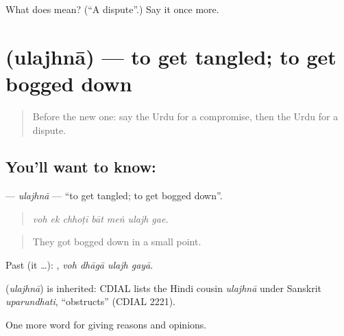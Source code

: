 \begin{tcolorbox}[breakable,colback=teal!4,colframe=teal!35!black,title={Before you move on}]
What does  mean? (\textquotedblleft{}A dispute\textquotedblright{}.) Say it once more.
\end{tcolorbox}
\section[\texorpdfstring{\ur{الجھنا} (ulajhnā)}{الجھنا (ulajhnā)}]{ (ulajhnā) — to get tangled; to get bogged down}

\label{lesson:UR-C347-ulajhna}



\begin{quote}
Before the new one: say the Urdu for a compromise, then the Urdu for a dispute.
\end{quote}

\subsection*{You'll want to know: }
\textbf{} — \emph{ulajhnā} — \textquotedblleft{}to get tangled; to get bogged down\textquotedblright{}.

\begin{quote}
      
\end{quote}

\begin{quote}
\emph{voh ek chhoṭī bāt meṅ ulajh gae.}
\end{quote}

\begin{quote}
They got bogged down in a small point.
\end{quote}

Past (it …):    , \emph{voh dhāgā ulajh gayā}.

\begin{cousinweb}
\textbf{} (\emph{ulajhnā}) is inherited: CDIAL lists the Hindi cousin \emph{ulajhnā} under Sanskrit \emph{uparundhati}, \textquotedblleft{}obstructs\textquotedblright{} (CDIAL 2221).
\end{cousinweb}

\begin{grammarlens}[title={What you've built}]
One more word for giving reasons and opinions.
\end{grammarlens}

